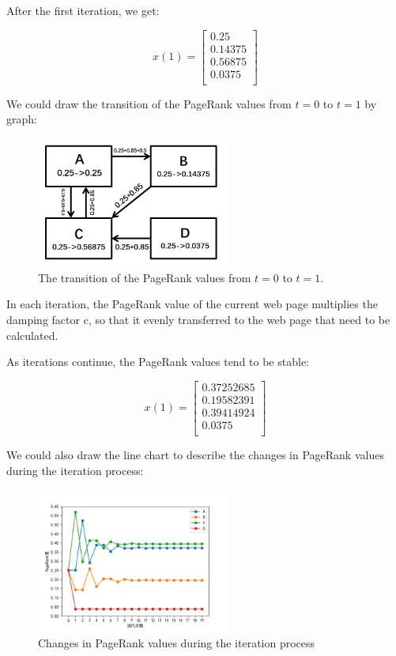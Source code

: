 \documentclass[lettersize,journal,12pt,conference]{IEEEtran}
\begin{document}
After the first iteration, we get:

\begin{equation}
	\label{eq:15}
	x(1) = \begin{bmatrix}
		0.25 \\
		0.14375 \\
		0.56875 \\
		0.0375 \\
		\end{bmatrix}
\end{equation}

We could draw the transition of the PageRank values from $t = 0$ to $t = 1$ by graph:

\begin{figure}[h]
	\centering
	\includegraphics[width=2.5in]{images/fig6.png}
	\caption{The transition of the PageRank values from $t = 0$ to $t = 1$.}
	\label{fig6}
\end{figure}

In each iteration, the PageRank value of the current web page multiplies the damping factor c, so that it evenly transferred to the web page that need to be calculated. 

As iterations continue, the PageRank values tend to be stable:

\begin{equation}
	\label{eq:16}
	x(1) = \begin{bmatrix}
		0.37252685 \\
		0.19582391 \\
		0.39414924 \\
		0.0375 \\
		\end{bmatrix}
\end{equation}

We could also draw the line chart to describe the changes in PageRank values during the iteration process:

\begin{figure}[h]
	\centering
	\includegraphics[width=2.5in]{images/fig7.png}
	\caption{Changes in PageRank values during the iteration process}
	\label{fig7}
\end{figure}
\end{document}
